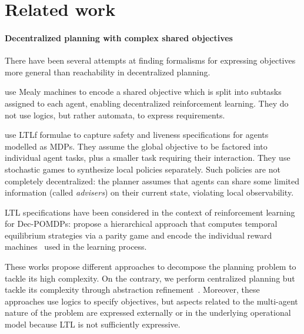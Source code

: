 \section{Related work}
\paragraph{Decentralized planning with complex shared objectives}

There have been several attempts at finding formalisms for expressing objectives more general than reachability in decentralized planning.

\citet{neary2021reward} use Mealy machines to encode a shared objective which is split into subtasks assigned to each agent, enabling decentralized reinforcement learning.
They do not use logics, but rather automata, to express requirements.

\citet{schuppe2021decentralized} use \ac{LTLf} formulae to capture safety and liveness specifications for agents modelled as \acp{MDP}.
They assume the global objective to be factored into individual agent tasks, plus a smaller task requiring their interaction.
They use stochastic games to synthesize local policies separately.
Such policies are not completely decentralized:
the planner assumes that agents can share some limited information (called \emph{advisers}) on their current state, violating local observability.

\acs{LTL} specifications have been considered in the context of reinforcement learning for \acp{Dec-POMDP}:
\citet{zhu2024decomposing} propose a hierarchical approach that computes temporal equilibrium strategies
via a parity game and encode the individual reward machines~\cite{neary2021reward} used in the learning process.    

These works propose different approaches to decompose the planning problem to tackle its high complexity.
On the contrary, we perform centralized planning but tackle its complexity through abstraction refinement~\cite{CeskaJJK19,Andriushchenko022}.
Moreover, these approaches use logics to specify objectives, but aspects related to the multi-agent nature of the problem are expressed externally or in the underlying operational model because \acs{LTL} is not sufficiently expressive.

\vspace{-5pt}
